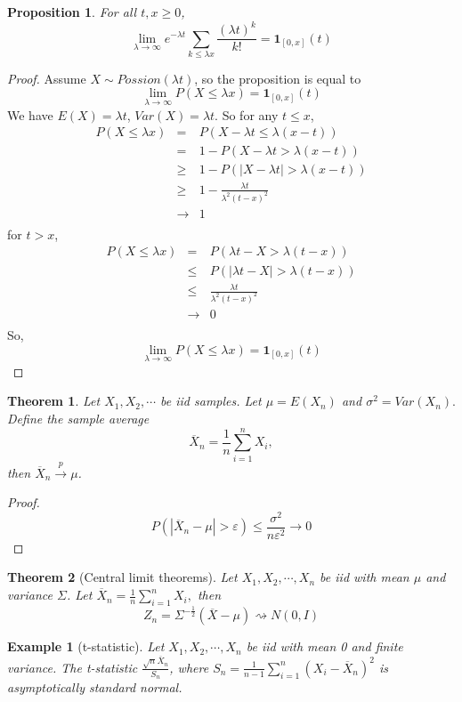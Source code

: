 \documentclass[11pt]{article}
\newtheorem{theorem}{Theorem}[section]
\newtheorem{proposition}{Proposition}[section]
\newtheorem{example}{Example}[section]
\begin{document}
\begin{proposition}
For all $t, x \geq 0$, 
$$
\lim_{\lambda \rightarrow \infty} e^{-\lambda t}\sum_{k\leq \lambda x} \frac{(\lambda t)^k}{k!} = \bm{1}_{[0,x]}(t)
$$
\end{proposition}
\begin{proof}
Assume $X\sim Possion(\lambda t)$, so the proposition is equal to 
$$
\lim_{\lambda \rightarrow \infty} P(X\leq \lambda x) = \bm{1}_{[0,x]}(t)
$$
We have $E(X) = \lambda t$, $Var(X) = \lambda t$. So for any $t \leq x$,
\begin{eqnarray*}
P(X\leq \lambda x) &=& P(X-\lambda t \leq \lambda(x-t)) \\
&=& 1-P(X-\lambda t > \lambda(x-t)) \\
&\geq& 1-P(|X-\lambda t| > \lambda(x-t)) \\
&\geq& 1-\frac{\lambda t}{\lambda^2(t-x)^2} \\
&\rightarrow& 1\\
\end{eqnarray*}
for $t>x$, 
\begin{eqnarray*}
P(X\leq \lambda x)&=& P(\lambda t-X > \lambda(t-x)) \\
&\leq& P(|\lambda t-X| > \lambda(t-x)) \\
&\leq& \frac{\lambda t}{\lambda^2(t-x)^2} \\
&\rightarrow& 0 \\
\end{eqnarray*}
So, $$
\lim_{\lambda \rightarrow \infty} P(X\leq \lambda x) = \bm{1}_{[0,x]}(t)
$$
\end{proof}
\begin{theorem}
Let $X_1, X_2, \cdots$ be iid samples. Let $\mu=E(X_n)$ and $\sigma^2 = Var(X_n).$ Define the sample average $$\overline{X}_n = \frac{1}{n}\sum_{i=1}^{n}X_i,$$ then $\overline{X}_n \xrightarrow{p} \mu$.
\end{theorem}
\begin{proof}
$$
P(|\overline{X}_n-\mu|>\varepsilon) \leq \frac{\sigma^2}{n\varepsilon^2}\rightarrow 0
$$
\end{proof}
\begin{theorem}[Central limit theorems]
Let $X_1, X_2, \cdots, X_n$ be iid with mean $\mu$ and variance $\Sigma$. Let $\overline{X}_n = \frac{1}{n}\sum_{i=1}^{n}X_i,$ then 
$$
Z_n = \Sigma^{-\frac{1}{2}}(\overline{X}-\mu) \rightsquigarrow N(0,I)
$$
\end{theorem}
\begin{example}[t-statistic]
Let $X_1, X_2, \cdots, X_n$ be iid with mean 0 and finite variance. The t-statistic $\frac{\sqrt{n}\overline{X}_n}{S_n}$, where $S_n = \frac{1}{n-1}\sum_{i=1}^{n}(X_i-\overline{X}_n)^2$ is asymptotically standard normal.
\end{example}
\end{document}

